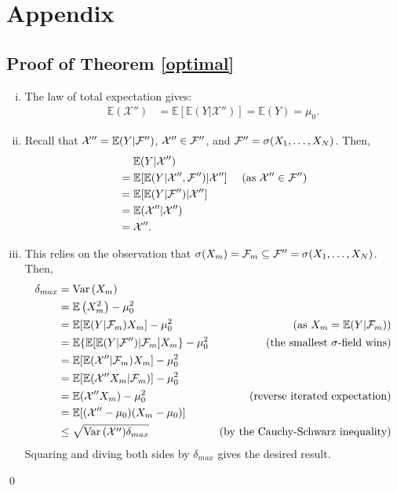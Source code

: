 \documentclass[11pt]{article}
\newcommand{\E}{\mathbb{E}}
\theoremstyle{definition}
\theoremstyle{definition}
\def\F{{\cal F}}
\def\E{{\mathbb E}}
\def\Var{{\rm Var}\,}
\begin{document}
\appendix
\section{Appendix}
\subsection{Proof of Theorem \ref{optimal}}
\begin{enumerate}[i)]
\item The law of total expectation gives:
\begin{align*}
\E(\mathcal{X}'') &= \E[\E(Y|\mathcal{X}'')] =  \E(Y) = \mu_0.
\end{align*}

\item Recall that $ \mathcal{X}'' = \E(Y | \F'')$, $\mathcal{X}'' \in \F''$, and $\F'' = \sigma(X_1, \dots, X_N)$. Then,
\begin{align*}
&\hspace{1.3em}  \E(Y | \mathcal{X}'') \\
 &= \E[\E(Y|\mathcal{X}'',\F'')|\mathcal{X}''] & \text{ (as $\mathcal{X}'' \in \F''$)}\\
&= \E[\E(Y|\F'')|\mathcal{X}'']\\
&= \E(\mathcal{X}''|\mathcal{X}'') \\
&= \mathcal{X}''.
\end{align*}

\item This relies on the observation that $\sigma(X_m) = \F_m \subseteq \F'' = \sigma(X_1, \dots, X_N)$. Then,
\begin{align*}
\delta_{max} &=\Var(X_m)\\
 &= \E\left(X_m^2\right) - \mu_0^2\\
 &= \E[\E(Y|\F_m)X_m] - \mu_0^2 & \text{(as $X_m = \E(Y|\F_m)$)}\\
 &= \E\{\E[\E(Y|\F'')|\F_m]X_m\} - \mu_0^2 & \text{(the smallest $\sigma$-field wins)}\\
 &= \E[\E(\mathcal{X}''|\F_m)X_m] - \mu_0^2 \\
 &= \E[\E(\mathcal{X}''X_m|\F_m)] - \mu_0^2 \\
 &= \E(\mathcal{X}''X_m) - \mu_0^2 & \text{(reverse iterated expectation)} \\
 &= \E[(\mathcal{X}''-\mu_0)(X_m-\mu_0)]  \\
 &\leq \sqrt{\Var(\mathcal{X}'')\delta_{max} } & \text{(by the Cauchy-Schwarz inequality)} 
\end{align*}
Squaring and diving both sides by $\delta_{max} $ gives the desired result. 

\end{enumerate}
\qed
\end{document}

